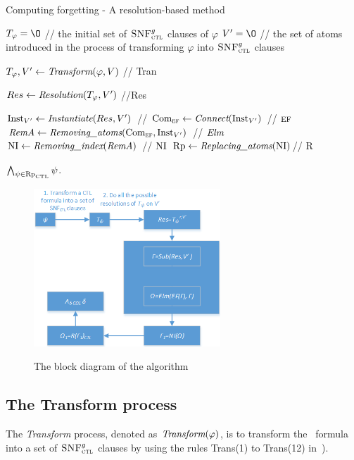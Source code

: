 \documentclass[letterpaper]{article} %
\begin{document}
\begin{algorithm}[!h]
\caption{Computing forgetting - A resolution-based method}%
\label{alg:compute:forgetting:by:Resolution}
$T_{\varphi}={\O}$ // the initial set of ${\textsc{SNF}_{\textsc{ctl}}^g}$ clauses of $\varphi$ \;
$V'={\O}$ // the set of atoms introduced in the process of transforming $\varphi$ into ${\textsc{SNF}_{\textsc{ctl}}^g}$ clauses\;


$T_{\varphi}, V' \leftarrow \emph{Transform}(\varphi, V)$ // Tran\;

$Res \leftarrow \emph{Resolution}(T_{\varphi}, V')$ //Res \;

$\textrm{Inst}_{V'} \leftarrow \emph{Instantiate}(Res, V')$ //\Sub\;
$\textrm{Com}_{\textsc{e}\textsc{f}} \leftarrow \emph{Connect}(\textrm{Inst}_{V'})$  // $\textsc{e}\textsc{f}$\;
$\emph{RemA} \leftarrow \emph{Removing\_atoms}(\textrm{Com}_{\textsc{e}\textsc{f}}, \textrm{Inst}_{V'})$ // $\textit{Elm}$\;
$\textrm{NI} \leftarrow \emph{Removing\_index}(\emph{RemA})$ // $\textrm{NI}$\;
$\textrm{Rp} \leftarrow \emph{Replacing\_atoms}(\textrm{NI})$// R\;

\Return $\bigwedge_{\psi \in \textrm{Rp}_{\textrm{CTL}}} \psi$.
\end{algorithm}

\begin{figure}
  \centering
  \includegraphics[width=7cm]{lct.png}\\
  \caption{The block diagram of the algorithm}\label{Fig:lct}
\end{figure}



\subsection{The Transform process}
The \emph{Transform} process, denoted as $\emph{Transform}(\varphi)$, is to transform the \CTL\ formula into a set of ${\textsc{SNF}_{\textsc{ctl}}^g}$ clauses by using the rules  Trans(1) to Trans(12) in~\cite{zhang2009refined}).
\end{document}
